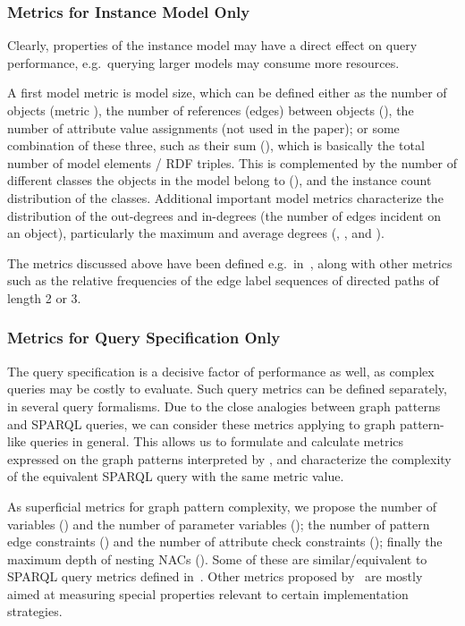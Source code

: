\subsubsection{Metrics for Instance Model Only}
Clearly, properties of the instance model may have a direct effect on query
performance, e.g.\ querying larger models may consume  more resources.

A first model metric is model size, which can be defined either as the
number of objects (metric ), the number of references (edges)
between objects (), the number of attribute value assignments
(not used in the paper);
or some combination of
these three, such as their sum (), which is basically the
total number of model elements / RDF triples. This is complemented by the number
of different classes the objects in the model belong to (), and
the instance count distribution of the classes. %
Additional important model metrics characterize the distribution of the
out-degrees and in-degrees (the number of edges incident on an object),
particularly the maximum and average degrees (,
,  and ).
 
The metrics discussed above have been defined e.g.\ in~\cite{COLD2012-analysis-DBLP:conf/semweb/StarkaSM12}, along with other
metrics such as the relative frequencies of the edge label sequences of directed
paths of length 2 or 3.
 
\subsubsection{Metrics for Query Specification Only}
The query specification is a decisive factor of performance as well, as complex
queries may be costly to evaluate. Such query metrics can be defined separately,
in several query formalisms. Due to the
close analogies between graph patterns and SPARQL queries, we can consider these
metrics applying to graph pattern-like queries in general. This allows us to
formulate and calculate metrics expressed on the graph patterns interpreted by
\incquery{}, and characterize the complexity of the equivalent SPARQL query with
the same metric value.

As superficial metrics for graph pattern complexity, we propose the number of
variables () and the number of parameter variables
(); the number of pattern edge constraints
() and the number of attribute check constraints
(); finally the maximum depth of nesting NACs
(). Some of these are similar/equivalent to 
SPARQL query metrics defined in~\cite{SPLODGE}. Other metrics proposed
by~\cite{SPLODGE} are mostly aimed at measuring special properties relevant to
certain implementation strategies.

